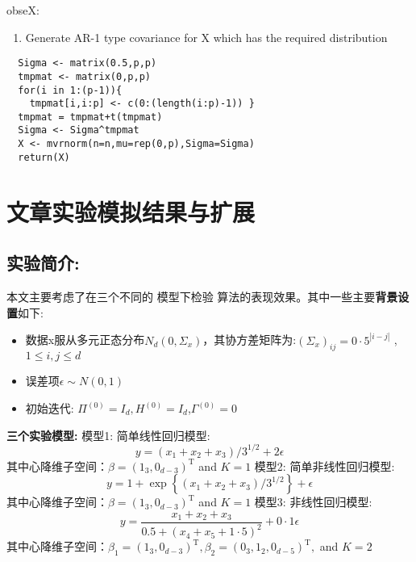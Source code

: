 \documentclass[lang=cn,11pt,a4paper]{elegantpaper}
\newcommand{\Blue}[1]{\textcolor[rgb]{0,0,0.803}{#1}}
\begin{document}

\Blue{\large obseX:} 
\begin{enumerate}
    \item Generate AR-1 type covariance for X which has the required distribution
\end{enumerate}

\begin{lstlisting}
  Sigma <- matrix(0.5,p,p)
  tmpmat <- matrix(0,p,p)
  for(i in 1:(p-1)){
    tmpmat[i,i:p] <- c(0:(length(i:p)-1)) }
  tmpmat = tmpmat+t(tmpmat)
  Sigma <- Sigma^tmpmat	
  X <- mvrnorm(n=n,mu=rep(0,p),Sigma=Sigma)
  return(X)
\end{lstlisting}


\section{文章实验模拟结果与扩展}

\subsection{实验简介:}
本文主要考虑了在三个不同的 模型下检验 算法的表现效果。其中一些主要\textbf{背景设置}如下:
\begin{itemize}
    \item 数据x服从多元正态分布$N_{d}\left(0, \Sigma_{x}\right)$，其协方差矩阵为:$\left(\Sigma_{x}\right)_{i j}=0 \cdot 5^{|i-j|}$ , $1 \leqslant i, j \leqslant d$
    \item 误差项$\epsilon \sim N(0,1)$
    \item  初始迭代: $\Pi^{(0)}=I_{d}, H^{(0)}=I_{d}$,$\Gamma^{(0)}=0$
\end{itemize}

\large{\textbf{\Blue{三个实验模型:}}} \newline
\Blue{模型1:} 简单线性回归模型:
$$y=\left(x_{1}+x_{2}+x_{3}\right) / 3^{1 / 2}+2 \epsilon$$
其中心降维子空间：$\beta=\left(1_{3}, 0_{d-3}\right)^{\mathrm{T}}$ and $K=1$
\newline
\newline
\Blue{模型2:} 简单非线性回归模型:
$$y=1+\exp \left\{\left(x_{1}+x_{2}+x_{3}\right) / 3^{1 / 2}\right\}+\epsilon$$
其中心降维子空间：$\beta=\left(1_{3}, 0_{d-3}\right)^{\mathrm{T}}$ and $K=1$
\newline
\newline
\Blue{模型3:} 非线性回归模型:
$$y=\frac{x_{1}+x_{2}+x_{3}}{0.5+\left(x_{4}+x_{5}+1 \cdot 5\right)^{2}}+0 \cdot 1 \epsilon$$
其中心降维子空间：$\beta_{1}=\left(1_{3}, 0_{d-3}\right)^{\mathrm{T}}, \beta_{2}=\left(0_{3}, 1_{2}, 0_{d-5}\right)^{\mathrm{T}},$ and $K=2$
\end{document}
